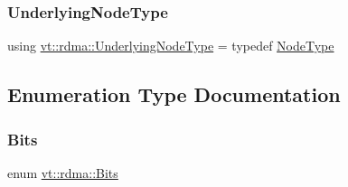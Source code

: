 \mbox{\label{namespacevt_1_1rdma_a20d01bc82b95453c162d4b9857a4a78a}} 
\subsubsection{\texorpdfstring{Underlying\+Node\+Type}{UnderlyingNodeType}}
{\footnotesize\ttfamily using \hyperlink{namespacevt_1_1rdma_a20d01bc82b95453c162d4b9857a4a78a}{vt\+::rdma\+::\+Underlying\+Node\+Type} = typedef \hyperlink{namespacevt_a866da9d0efc19c0a1ce79e9e492f47e2}{Node\+Type}}



\subsection{Enumeration Type Documentation}
\mbox{\label{namespacevt_1_1rdma_a91e7211515508952960ca446ea609f65}} 
\subsubsection{\texorpdfstring{Bits}{Bits}}
{\footnotesize\ttfamily enum \hyperlink{namespacevt_1_1rdma_a91e7211515508952960ca446ea609f65}{vt\+::rdma\+::\+Bits}}

